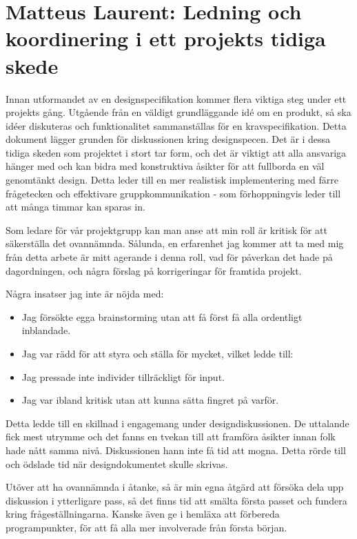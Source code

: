 \section{Matteus Laurent: Ledning och koordinering i ett projekts tidiga skede}

Innan utformandet av en designspecifikation kommer flera viktiga steg under ett projekts gång. Utgående från en väldigt grundläggande idé om en produkt, så ska idéer diskuteras och funktionalitet sammanställas för en kravspecifikation. Detta dokument lägger grunden för diskussionen kring designspecen. Det är i dessa tidiga skeden som projektet i stort tar form, och det är viktigt att alla ansvariga hänger med och kan bidra med konstruktiva åsikter för att fullborda en väl genomtänkt design. Detta leder till en mer realistisk implementering med färre frågetecken och effektivare gruppkommunikation - som förhoppningvis leder till att många timmar kan sparas in.

Som ledare för vår projektgrupp kan man anse att min roll är kritisk för att säkerställa det ovannämnda. Sålunda, en erfarenhet jag kommer att ta med mig från detta arbete är mitt agerande i denna roll, vad för påverkan det hade på dagordningen, och några förslag på korrigeringar för framtida projekt.

Några insatser jag inte är nöjda med:
\begin{itemize}
\item Jag försökte egga brainstorming utan att få först få alla ordentligt inblandade.
\item Jag var rädd för att styra och ställa för mycket, vilket ledde till:
\item Jag pressade inte individer tillräckligt för input.
\item Jag var ibland kritisk utan att kunna sätta fingret på varför.
\end{itemize}
Detta ledde till en skillnad i engagemang under designdiskussionen. De uttalande fick mest utrymme
och det fanns en tvekan till att framföra åsikter innan folk hade nått samma nivå.
Diskussionen hann inte få tid att mogna. Detta rörde till och ödslade tid när
designdokumentet skulle skrivas.

Utöver att ha ovannämnda i åtanke, så är min egna åtgärd att försöka dela upp diskussion i ytterligare pass,
så det finns tid att smälta första passet och fundera kring frågeställningarna. Kanske även ge i hemläxa
att förbereda programpunkter, för att få alla mer involverade från första början.
